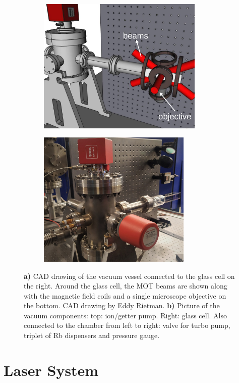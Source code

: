 \begin{figure}
	\begin{subfigure}{.5\linewidth}
		\flushleft
		\includegraphics[height=6.5cm]{figures/CADeditSmall.pdf}
		\caption{}
		\label{fig:VacuumSetup}
	\end{subfigure}
	\hfill
	\begin{subfigure}{.49\linewidth}
		\flushright
		\includegraphics[height=6.5cm]{figures/Chamber.jpg}
		\caption{}
		\label{fig:Chamber}
	\end{subfigure}
	\caption{\textsf{\textbf{a)}} CAD drawing of the vacuum vessel connected to the glass cell on the right. 
	Around the glass cell, the MOT beams are shown along with the magnetic field coils and a single microscope objective on the bottom. 
	CAD drawing by Eddy Rietman.
    \textsf{\textbf{b)}} Picture of the vacuum components: top: ion/getter pump. Right: glass cell. Also connected to the chamber from left to right: valve for turbo pump, triplet of Rb dispensers and pressure gauge.}
\end{figure}

\section{Laser System}\label{sec:LaserSystem}

